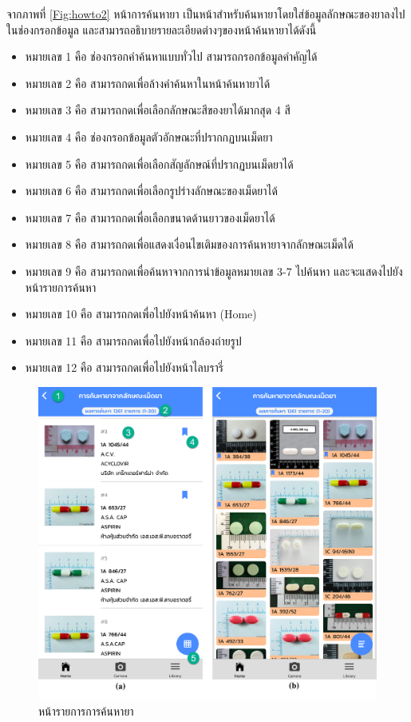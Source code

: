 จากภาพที่ \ref{Fig:howto2} หน้าการค้นหายา เป็นหน้าสำหรับค้นหายาโดยใส่ข้อมูลลักษณะของยาลงไปในช่องกรอกข้อมูล และสามารถอธิบายรายละเอียดต่างๆของหน้าค้นหายาได้ดังนี้
\begin{itemize}[label={--}]
	\item หมายเลข 1 คือ ช่องกรอกคำค้นหาแบบทั่วไป สามารถกรอกข้อมูลคำคัญได้
    \item หมายเลข 2 คือ สามารถกดเพื่อล้างคำค้นหาในหน้าค้นหายาได้ 
    \item หมายเลข 3 คือ สามารถกดเพื่อเลือกลักษณะสีของยาได้มากสุด 4 สี
    \item หมายเลข 4 คือ ช่องกรอกข้อมูลตัวอักษณะที่ปรากกฏบนเม็ดยา
    \item หมายเลข 5 คือ สามารถกดเพื่อเลือกสัญลักษณ์ที่ปรากฏบนเม็ดยาได้
    \item หมายเลข 6 คือ สามารถกดเพื่อเลือกรูปร่างลักษณะของเม็ดยาได้
    \item หมายเลข 7 คือ สามารถกดเพื่อเลือกขนาดด้านยาวของเม็ดยาได้
    \item หมายเลข 8 คือ สามารถกดเพื่อแสดงเงื่อนไขเติมของการค้นหายาจากลักษณะเม็ดได้
    \item หมายเลข 9 คือ สามารถกดเพื่อค้นหาจากการนำข้อมูลหมายเลข 3-7 ไปค้นหา และจะแสดงไปยังหน้ารายการค้นหา
    \item หมายเลข 10 คือ สามารถกดเพื่อไปยังหน้าค้นหา (Home) 	 
    \item หมายเลข 11 คือ สามารถกดเพื่อไปยังหน้ากล้องถ่ายรูป
    \item หมายเลข 12 คือ สามารถกดเพื่อไปยังหน้าไลบรารี่
\end{itemize}

\begin{figure}[H]
    \includegraphics[width=\columnwidth]{Figures/7/16}
    \caption{หน้ารายการการค้นหายา}
    \label{Fig:howto3}
\end{figure}

